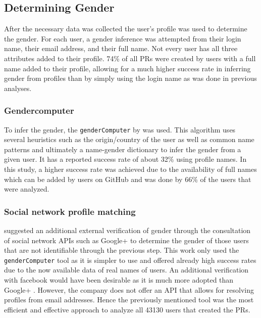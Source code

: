 \subsection{Determining Gender}
After the necessary data was collected the user's profile was used to determine the gender. For each user, a gender inference was attempted from their login name, their email address, and their full name. Not every user has all three attributes added to their profile. 74\% of all \ac{PR}s were created by users with a full name added to their profile, allowing for a much higher success rate in inferring gender from profiles than by simply using the login name as was done in previous analyses.
\subsubsection{Gendercomputer}
To infer the gender, the \lstinline|genderComputer| by \citeauthor{vasilescu:2012:6542459} was used. This algorithm uses several heuristics such as the origin/country of the user as well as common name patterns and ultimately a name-gender dictionary to infer the gender from a given user. It has a reported success rate of about 32\% \cite{Vasilescu:2015:GTD:2702123.2702549} using profile names. In this study, a higher success rate was achieved due to the availability of full names which can be added by users on GitHub and was done by 66\% of the users that were analyzed.

\subsubsection{Social network profile matching}
\citeauthor{genderdiff:2016} suggested an additional external verification of gender through the consultation of social network \ac{API}s such as Google+ to determine the gender of those users that are not identifiable through the previous step.
This work only used the \lstinline|genderComputer| tool as it is simpler to use and offered already high success rates due to the now available data of real names of users. An additional verification with facebook would have been desirable as it is much more adopted than Google+ \cite{googleplusstats:2015,facebookstats:2017}. However, the company does not offer an \ac{API} that allows for resolving profiles from email addresses. Hence the previously mentioned tool was the most efficient and effective approach to analyze all 43130 users that created the \ac{PR}s.

